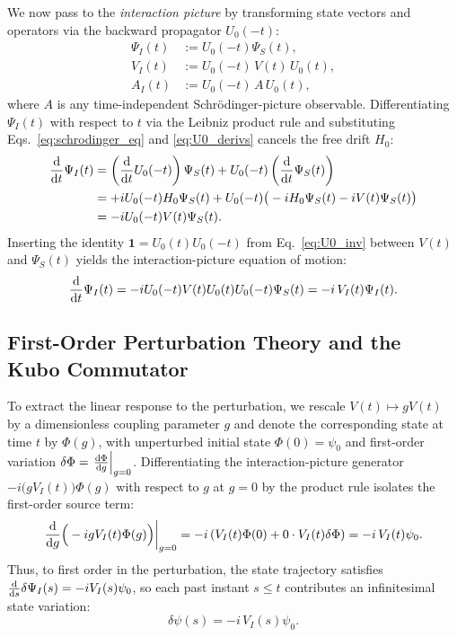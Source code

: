 \documentclass[11pt, a4paper]{article}
\numberwithin{equation}{section}
\begin{document}
We now pass to the \emph{interaction picture} by transforming state vectors and operators via the backward propagator $U_0(-t)$:
\begin{align}
  \Psi_I(t) &:= U_0(-t) \Psi_S(t), \label{eq:Psi_I} \\
  V_I(t) &:= U_0(-t) \, V(t) \, U_0(t), \label{eq:V_I} \\
  A_I(t) &:= U_0(-t) \, A \, U_0(t), \label{eq:A_I}
\end{align}
where $A$ is any time-independent Schr\"odinger-picture observable. Differentiating $\Psi_I(t)$ with respect to $t$ via the Leibniz product rule and substituting Eqs.~\eqref{eq:schrodinger_eq} and \eqref{eq:U0_derivs} cancels the free drift $H_0$:
\begin{align}
  \dv{t} \Psi_I(t)
  &= \left( \dv{t} U_0(-t) \right) \Psi_S(t) + U_0(-t) \left( \dv{t} \Psi_S(t) \right) \nonumber \\
  &= +i U_0(-t) H_0 \Psi_S(t) + U_0(-t) \big( -i H_0 \Psi_S(t) - i V(t) \Psi_S(t) \big) \nonumber \\
  &= -i U_0(-t) V(t) \Psi_S(t).
\end{align}
Inserting the identity $\mathbf{1} = U_0(t) U_0(-t)$ from Eq.~\eqref{eq:U0_inv} between $V(t)$ and $\Psi_S(t)$ yields the interaction-picture equation of motion:
\begin{equation}\label{eq:interaction_schrodinger}
  \dv{t} \Psi_I(t) = -i U_0(-t) V(t) U_0(t) U_0(-t) \Psi_S(t) = -i \, V_I(t) \Psi_I(t).
\end{equation}

\subsection{First-Order Perturbation Theory and the Kubo Commutator}

To extract the linear response to the perturbation, we rescale $V(t) \mapsto g V(t)$ by a dimensionless coupling parameter $g$ and denote the corresponding state at time $t$ by $\Phi(g)$, with unperturbed initial state $\Phi(0) = \psi_0$ and first-order variation $\delta\Phi = \eval{\dv{\Phi}{g}}_{g=0}$. Differentiating the interaction-picture generator $-i \big(g V_I(t)\big) \Phi(g)$ with respect to $g$ at $g = 0$ by the product rule isolates the first-order source term:
\begin{equation}\label{eq:perturbation_zero}
  \eval{\dv{g} \Big( -i g V_I(t) \Phi(g) \Big)}_{g=0}
  = -i \left( V_I(t) \Phi(0) + 0 \cdot V_I(t) \delta\Phi \right)
  = -i \, V_I(t) \psi_0.
\end{equation}
Thus, to first order in the perturbation, the state trajectory satisfies $\dv{s} \delta\Psi_I(s) = -i V_I(s) \psi_0$, so each past instant $s \le t$ contributes an infinitesimal state variation:
\begin{equation}
  \delta\psi(s) = -i \, V_I(s) \psi_0.
\end{equation}
\end{document}

